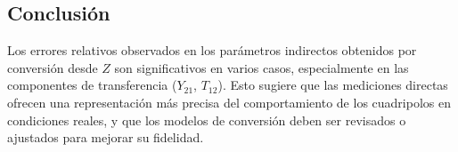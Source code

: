 \subsection*{Conclusión}

Los errores relativos observados en los parámetros indirectos obtenidos por conversión desde $Z$ son
significativos en varios casos, especialmente en las componentes de transferencia ($Y_{21}$, $T_{12}$).
Esto sugiere que las mediciones directas ofrecen una representación más precisa del comportamiento de
los cuadripolos en condiciones reales, y que los modelos de conversión deben ser revisados o ajustados
para mejorar su fidelidad.
